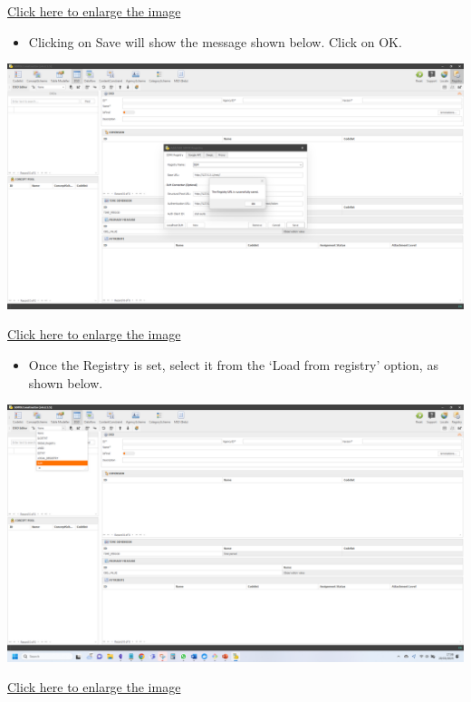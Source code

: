 \documentclass[
]{book}
\providecommand{\tightlist}{%
  \setlength{\itemsep}{0pt}\setlength{\parskip}{0pt}}
\begin{document}
\href{images/image212.png}{Click here to enlarge the image}

\begin{itemize}
\tightlist
\item
  Clicking on Save will show the message shown below. Click on OK.
\end{itemize}

\begin{center}\includegraphics[width=1\linewidth]{./images/image214} \end{center}

\href{images/image214.png}{Click here to enlarge the image}

\begin{itemize}
\tightlist
\item
  Once the Registry is set, select it from the `Load from registry' option, as shown below.
\end{itemize}

\begin{center}\includegraphics[width=1\linewidth]{./images/image216} \end{center}

\href{images/image216.png}{Click here to enlarge the image}
\end{document}
